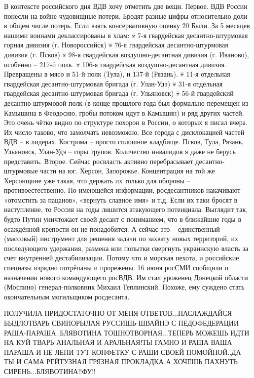 В контексте российского дня ВДВ хочу отметить две вещи.
Первое. ВДВ России понесли на войне чудовищные потери. Бродят разные цифры относительно доли в общем числе потерь. Если взять консервативную оценку 20%
Были.
За 5 месяцев нашими воинами деклассированы в хлам:
💀 7-я гвардейская десантно-штурмовая горная дивизия (г. Новороссийск)
💀 76-я гвардейская десантно-штурмовая дивизия (г. Псков)
💀 98-я гвардейская воздушно-десантная дивизия (г. Иваново), особенно – 217-й полк.
💀 106-я гвардейская воздушно-десантная дивизия. Превращены в мясо и 51-й полк (Тула), и 137-й (Рязань).
💀 11-я отдельная гвардейская десантно-штурмовая бригада (г. Улан-Удэ)
💀 31-я отдельная гвардейская десантно-штурмовая бригада (г. Ульяновск)
💀 56-й гвардейский десантно-штурмовой полк (в конце прошлого года был формально перемещён из Камышина в Феодосию, гробы потоком идут в Камышин)
и ряд других частей.
Это очень чётко видно по структуре похорон в России, о которых я писал вчера. Их число таково, что замолчать невозможно.
Все города с дисклокацией частей ВДВ – в лидерах. Кострома – просто сплошное кладбище. Псков, Тула, Рязань, Ульяновск, Улан-Удэ – горы трупов.
Количество инвалидов я даже не берусь представить.
Второе. Сейчас росвласть активно перебрасывает десантно-штурмовые части на юг. Херсон, Запорожье.
Концентрация на той же Херсонщине уже такая, что держать их только для обороны – противоестественно.
По имеющейся информации, росдесантников накачивают «отомстить за пацанов», «вернуть славное имя» и т.д. Если их таки бросят в наступление, то Россия на годы лишится атакующего потенциала.
Выглядит так, будто Путин уничтожает своей десант с пониманием, что в ближайшие годы в осаждённой крепости он не понадобится. А сейчас это – единственный (массовый) инструмент для решения задачи по захвату новых территорий, их последующего удержания, размена или попытки свергнуть украинскую власть за счет внутренней дестабилизации. Потому что и морская пехота, и российские спецназы изрядно потрёпаны и прорежены.
16 июня росСМИ сообщили о назначении нового командующего росВДВ. Им стал уроженец Донецкой области (Моспино) генерал-полковник Михаил Теплинский. Похоже, ему суждено стать окончательным могильщиком росдесанта.

ПОЛУЧИЛА ПРИДОСТАТОЧНО ОТ МЕНЯ ОТВЕТОВ...НАСЛАЖДАЙСЯ БЫДЛОТВАРЬ СВИНОРЫЛАЯ
РУССИШЬ-ШВАЙНЭ С ПЕДОФЕДЕРАЦИИ РАША-ПАРАША..БЛЯВОТИНА ТОШНОТВОРНАЯ...ТЕПЕРЬ
МОЖЕШЬ ИДТИ НА КУЙ ТВАРЬ АНАЛЬНАЯ И АРАЛЬНАЯ!ТЫ ГАМНО И РАША ВАША ПАРАША И НЕ
ЛЕПИ ТУТ КОНФЕТКУ С РАШИ СВОЕЙ ПОМОЙНОЙ..ДА ТЫ И САМА РЕЙТУЗНАЯ ГРЯЗНАЯ
ПРОКЛАДКА А ХОЧЕШЬ ПАХНУТЬ СИРЕНЬ...БЛЯВОТИНА!!ФУ!!

